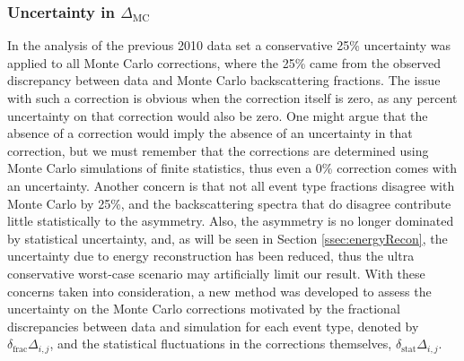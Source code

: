\subsubsection{Uncertainty in $\Delta_{\mathrm{MC}}$} \label{sssec:mcuncert}

In the analysis of the previous 2010 data set \cite{mendenhall2013} a
conservative 25\% uncertainty was applied to all Monte Carlo corrections, where the
25\% came from the observed discrepancy between data and Monte Carlo backscattering
fractions.  
The issue with such a correction is obvious when the correction itself is zero, as
any percent uncertainty on that correction would also be zero. One might argue that
the absence of a correction would imply the absence of an uncertainty in that correction,
but we must remember that the corrections are determined using Monte Carlo simulations
of finite statistics, thus even a 0\% correction comes with an uncertainty.
Another concern is that not all event type fractions disagree with Monte Carlo by
25\%, and the backscattering spectra that do disagree contribute little statistically
to the asymmetry. Also, the asymmetry is no longer dominated by statistical uncertainty,
and, as will be seen in Section \ref{ssec:energyRecon}, the uncertainty due to energy
reconstruction has been reduced, thus the ultra conservative worst-case scenario may
artificially limit our result.
With these  concerns taken into consideration, a new method was developed to assess
the uncertainty on the Monte Carlo corrections motivated by the fractional discrepancies
between data and simulation for each event type, denoted by $\delta_{\mathrm{frac}}\Delta_{i,j}$,
and the statistical fluctuations in the
corrections themselves, $\delta_{\mathrm{stat}}\Delta_{i,j}$.
%
